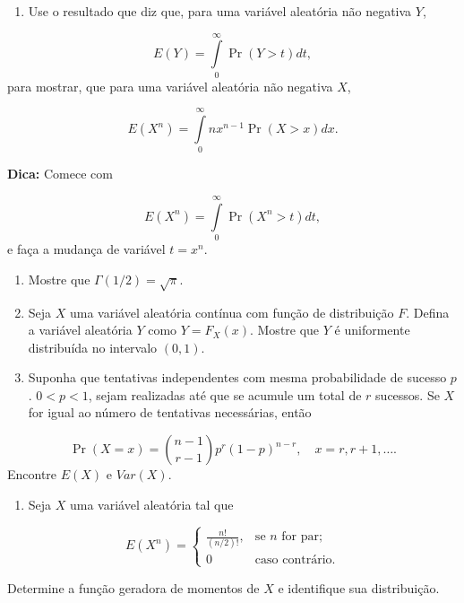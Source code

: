 \documentclass[
  letterpaper,
  DIV=11,
  numbers=noendperiod]{scrreprt}
\providecommand{\tightlist}{%
  \setlength{\itemsep}{0pt}\setlength{\parskip}{0pt}}\usepackage{longtable,booktabs,array}
\begin{document}
\begin{tcolorbox}[enhanced jigsaw, colback=white, leftrule=.75mm, colbacktitle=quarto-callout-caution-color!10!white, breakable, titlerule=0mm, bottomtitle=1mm, title=\textcolor{quarto-callout-caution-color}{\faFire}\hspace{0.5em}{Exercícios}, colframe=quarto-callout-caution-color-frame, toprule=.15mm, opacityback=0, bottomrule=.15mm, opacitybacktitle=0.6, arc=.35mm, toptitle=1mm, rightrule=.15mm, coltitle=black, left=2mm]

\begin{enumerate}
\def\labelenumi{\arabic{enumi})}
\tightlist
\item
  Use o resultado que diz que, para uma variável aleatória não negativa
  \(Y\),
\end{enumerate}

\[E(Y) = \int\limits_{0}^{\infty} \Pr(Y > t) dt,\] para mostrar, que
para uma variável aleatória não negativa \(X\),

\[E(X^n) = \int\limits_{0}^{\infty} n x^{n-1} \Pr(X > x) dx.\]

\textbf{Dica:} Comece com

\[E(X^n) = \int\limits_{0}^{\infty}  \Pr(X^n > t) dt,\] e faça a mudança
de variável \(t = x^n\).

\begin{enumerate}
\def\labelenumi{\arabic{enumi}.}
\setcounter{enumi}{1}
\item
  Mostre que \(\Gamma(1/2) = \sqrt{\pi}\).
\item
  Seja \(X\) uma variável aleatória contínua com função de distribuição
  \(F\). Defina a variável aleatória \(Y\) como \(Y = F_X(x)\). Mostre
  que \(Y\) é uniformente distribuída no intervalo \((0,1)\).
\item
  Suponha que tentativas independentes com mesma probabilidade de
  sucesso \(p\). \(0 < p < 1\), sejam realizadas até que se acumule um
  total de \(r\) sucessos. Se \(X\) for igual ao número de tentativas
  necessárias, então
\end{enumerate}

\[\Pr(X = x) = \binom{n-1}{r-1} p^r (1-p)^{n-r}, \quad x = r, r+1, \dots.\]
Encontre \(E(X)\) e \(Var(X)\).

\begin{enumerate}
\def\labelenumi{\arabic{enumi}.}
\setcounter{enumi}{4}
\tightlist
\item
  Seja \(X\) uma variável aleatória tal que
\end{enumerate}

\[E(X^n) = \left\{ 
\begin{array}{cc}
\frac{n!}{(n/2)!}, & \text{se $n$ for par};\\
0 & \text{caso contrário}.
\end{array}\right.\]

Determine a função geradora de momentos de \(X\) e identifique sua
distribuição.

\end{tcolorbox}
\end{document}
